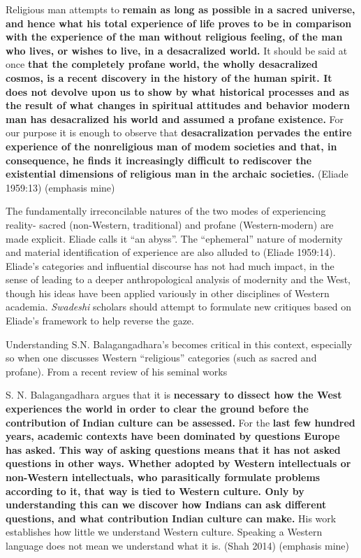 Religious man attempts to \textbf{remain as long as possible in a sacred universe, and hence what his total experience of life proves to be in comparison with the experience of the man without religious feeling, of the man who lives, or wishes to live, in a desacralized world.} It should be said at once \textbf{that the completely profane world, the wholly desacralized cosmos, is a recent discovery in the history of the human spirit. It does not devolve upon us to show by what historical processes and as the result of what changes in spiritual attitudes and behavior modern man has desacralized his world and assumed a profane existence.} For our purpose it is enough to observe that \textbf{desacralization pervades the entire experience of the nonreligious man of modem societies and that, in consequence, he finds it increasingly difficult to rediscover the existential dimensions of religious man in the archaic societies.} \hfill (Eliade 1959:13) (emphasis mine)

The fundamentally irreconcilable natures of the two modes of experiencing reality- sacred (non-Western, traditional) and profane (Western-modern) are made explicit. Eliade calls it “an abyss”. The “ephemeral” nature of modernity and material identification of experience are also alluded to (Eliade 1959:14). Eliade's categories and influential discourse has not had much impact, in the sense of leading to a deeper anthropological analysis of modernity and the West, though his ideas have been applied variously in other disciplines of Western academia. \textit{Swadeshi} scholars should attempt to formulate new critiques based on Eliade's framework to help reverse the gaze.

Understanding S.N. Balagangadhara's becomes critical in this context, especially so when one discusses Western “religious” categories (such as sacred and profane). From a recent review of his seminal works

\begin{myquote}
S. N. Balagangadhara argues that it is \textbf{necessary to dissect how the West experiences the world in order to clear the ground before the contribution of Indian culture can be assessed.} For the \textbf{last few hundred years, academic contexts have been dominated by questions Europe has asked. This way of asking questions means that it has not asked questions in other ways. Whether adopted by Western intellectuals or non-Western intellectuals, who parasitically formulate problems according to it, that way is tied to Western culture. Only by understanding this can we discover how Indians can ask different questions, and what contribution Indian culture can make.} His work establishes how little we understand Western culture. Speaking a Western language does not mean we understand what it is. \hfill (Shah 2014) (emphasis mine)
\end{myquote}

